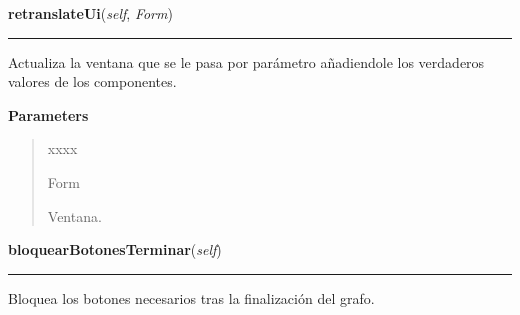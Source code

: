 \hspace{.8\funcindent}\begin{boxedminipage}{\funcwidth}

    \raggedright \textbf{retranslateUi}(\textit{self}, \textit{Form})

    \vspace{-1.5ex}

    \rule{\textwidth}{0.5\fboxrule}
\setlength{\parskip}{2ex}
    Actualiza la ventana que se le pasa por parámetro añadiendole los 
    verdaderos valores de los componentes.

\setlength{\parskip}{1ex}
      \textbf{Parameters}
      \vspace{-1ex}

      \begin{quote}
        \begin{Ventry}{xxxx}

          \item[Form]

          Ventana.

        \end{Ventry}

      \end{quote}

    \end{boxedminipage}

    \label{manejoGrafico:ManejoGrafico:bloquearBotonesTerminar}

    \vspace{0.5ex}

\hspace{.8\funcindent}\begin{boxedminipage}{\funcwidth}

    \raggedright \textbf{bloquearBotonesTerminar}(\textit{self})

    \vspace{-1.5ex}

    \rule{\textwidth}{0.5\fboxrule}
\setlength{\parskip}{2ex}
    Bloquea los botones necesarios tras la finalización del grafo.

\setlength{\parskip}{1ex}
    \end{boxedminipage}

    \label{manejoGrafico:ManejoGrafico:errorNoCategorias}

